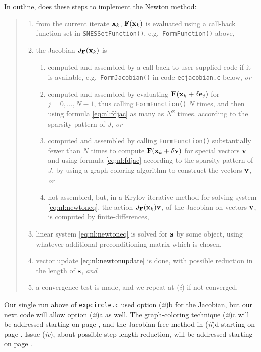 In outline, \pSNES does these steps to implement the Newton method:
\begin{quote}
	\renewcommand{\labelenumi}{(\emph{\roman{enumi}})}
	\renewcommand{\labelenumii}{\emph{\alph{enumii}}.}
	\begin{enumerate}
	\item from the current iterate $\mathbf{x}_k$, $\mathbf{F}(\mathbf{x}_k)$ is evaluated using a call-back function set in \texttt{SNESSetFunction()}, e.g.~\texttt{FormFunction()} above,
	\item the Jacobian $J_{\mathbf{F}}(\mathbf{x}_k)$ is
	    \begin{enumerate}
	    \item computed and assembled by a call-back to user-supplied code if it is available, e.g.~\texttt{FormJacobian()} in code \texttt{ecjacobian.c} below, \emph{or}
	    \item computed and assembled by evaluating $\mathbf{F}(\mathbf{x}_k+\delta \mathbf{e}_j)$ for $j=0,\dots,N-1$, thus  calling \texttt{FormFunction()} $N$ times, and then using formula \eqref{eq:nl:fdjac} as many as $N^2$ times, according to the sparsity pattern of $J$, \emph{or}
	    \item computed and assembled by calling \texttt{FormFunction()} substantially fewer than $N$ times to compute $\mathbf{F}(\mathbf{x}_k+\delta \mathbf{v})$ for special vectors $\mathbf{v}$ and using formula \eqref{eq:nl:fdjac} according to the sparsity pattern of $J$, by using a graph-coloring algorithm to construct the vectors $\mathbf{v}$, \emph{or}
	    \item not assembled, but, in a Krylov iterative method for solving system \eqref{eq:nl:newtoneq}, the action $J_{\mathbf{F}}(\mathbf{x}_k) \mathbf{v}$, of the Jacobian on vectors $\mathbf{v}$, is computed by finite-differences,
        \end{enumerate}
	\item linear system \eqref{eq:nl:newtoneq} is solved for $\mathbf{s}$ by some \pKSP object, using whatever additional preconditioning matrix which is chosen,
	\item vector update \eqref{eq:nl:newtonupdate} is done, with possible reduction in the length of $\mathbf{s}$, \emph{and}
	\item a convergence test is made, and we repeat at (\emph{i}) if not converged.
	\end{enumerate}
\end{quote}

Our single run above of \texttt{expcircle.c} used option (\emph{ii})b for the Jacobian, but our next code will allow option (\emph{ii})a as well.  The graph-coloring technique (\emph{ii})c will be addressed starting on page \pageref{sec:nl:coloring}, and the Jacobian-free method in (\emph{ii})d starting on page \pageref{sec:JFNK}.  Issue (\emph{iv}), about possible step-length reduction, will be addressed starting on page \pageref{sec:linesearch}.

